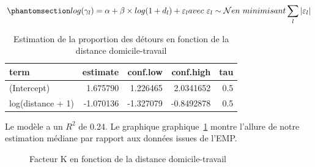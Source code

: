\documentclass[
  9pt,
  a4paper,
  DIV=11]{scrreprt}
\begin{document}
\begin{equation}\phantomsection\label{eq-prop-detours}{
log(\gamma_l) = \alpha + \beta \times log(1 + d_l) + \varepsilon_l
\\ avec\ \varepsilon_l \sim \mathcal{N}
\\ en\ minimisant \sum_l \left\lvert{\varepsilon_l}\right\lvert
}\end{equation}

\begin{longtable}{lrrrr}

\caption{\label{tbl-reg-detours}Estimation de la proportion des détours
en fonction de la distance domicile-travail}

\tabularnewline

\toprule
term & estimate & conf.low & conf.high & tau \\ 
\midrule\addlinespace[2.5pt]
(Intercept) & 1.675790 & 1.226465 & 2.0341652 & 0.5 \\ 
log(distance + 1) & -1.070136 & -1.327079 & -0.8492878 & 0.5 \\ 
\bottomrule

\end{longtable}

Le modèle a un \(R^2\) de 0.24. Le graphique graphique~\ref{fig-dist2K}
montre l'allure de notre estimation médiane par rapport aux données
issues de l'EMP.

\begin{figure}[htb]

\caption{\label{fig-dist2K}Facteur K en fonction de la distance
domicile-travail}


\end{figure}%
\end{document}
